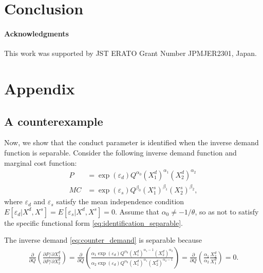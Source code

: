 \documentclass[11pt, a4paper]{article}
\theoremstyle{remark}
\begin{document}
\section{Conclusion}


\paragraph{Acknowledgments}
This work was supported by JST ERATO Grant Number JPMJER2301, Japan.  




\iffalse
\appendix
\section{Appendix}


\subsection{A counterexample}

Now, we show that the conduct parameter is identified when the inverse demand function is separable. 
Consider the following inverse demand function and marginal cost function:
\begin{align}
    P & = \exp(\varepsilon_{d}) Q^{\alpha_0} (X_{1}^{d})^{\alpha_1}(X_{2}^{d})^{\alpha_2}\label{eq:counter_demand}\\
    MC & = \exp(\varepsilon_{s})Q^{\beta_0} (X_{1}^{s})^{\beta_1} (X_{2}^{s})^{\beta_2},\label{eq:counter_mc}
\end{align}
where $\varepsilon_{d}$ and $\varepsilon_{s}$ satisfy the mean independence condition $E[\varepsilon_{d}|X^{d}, X^{s}] = E[\varepsilon_{s}|X^{d}, X^{s}] =0$. 
Assume that $\alpha_0 \ne -1/\theta$, so as not to satisfy the specific functional form \eqref{eq:identification_separable}.

The inverse demand \eqref{eq:counter_demand} is separable because
\begin{align}
    \frac{\partial }{\partial Q} \left(\frac{\partial P/\partial X_{1}^{d}}{\partial P/\partial X_{2}^{d}} \right) = \frac{\partial }{\partial Q} \left(\frac{\alpha_{1}\exp(\varepsilon_{d}) Q^{\alpha_0} (X_{1}^{d})^{\alpha_1-1}(X_{2}^{d})^{\alpha_2}}{\alpha_2\exp(\varepsilon_{d}) Q^{\alpha_0} (X_{1}^{d})^{\alpha_1}(X_{2}^{d})^{\alpha_2-1}} \right) =  \frac{\partial }{\partial Q}\left(\frac{\alpha_1}{\alpha_2} \frac{X_{2}^{d}}{X_{1}^{d}} \right)=0.
\end{align}
\end{document}
